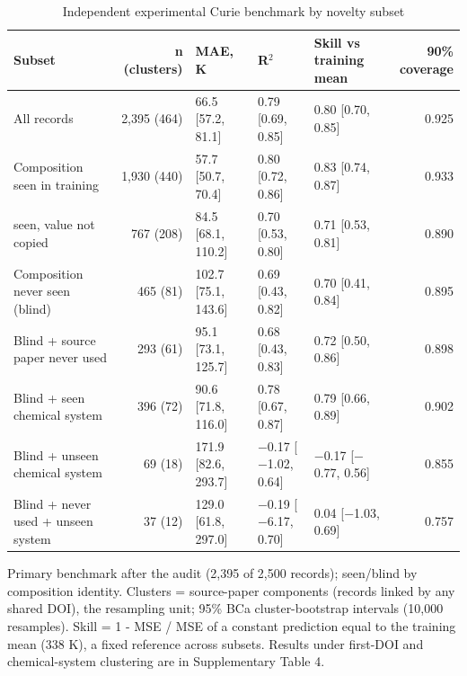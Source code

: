 \begin{table}
\caption{Independent experimental Curie benchmark by novelty subset}
\label{tab:table6_external_benchmark}
\tablefont
\begin{tabularx}{\textwidth}{@{}>{\raggedright\arraybackslash}Xrlllr@{}}
\toprule
\textbf{Subset} & \textbf{n (clusters)} & \textbf{MAE, K} & \textbf{R$^2$} & \textbf{Skill vs training mean} & \textbf{90\% coverage} \\
\midrule
All records & 2,395 (464) & 66.5 [57.2, 81.1] & 0.79 [0.69, 0.85] & 0.80 [0.70, 0.85] & 0.925 \\
Composition seen in training & 1,930 (440) & 57.7 [50.7, 70.4] & 0.80 [0.72, 0.86] & 0.83 [0.74, 0.87] & 0.933 \\
\quad seen, value not copied & 767 (208) & 84.5 [68.1, 110.2] & 0.70 [0.53, 0.80] & 0.71 [0.53, 0.81] & 0.890 \\
Composition never seen (blind) & 465 (81) & 102.7 [75.1, 143.6] & 0.69 [0.43, 0.82] & 0.70 [0.41, 0.84] & 0.895 \\
Blind + source paper never used & 293 (61) & 95.1 [73.1, 125.7] & 0.68 [0.43, 0.83] & 0.72 [0.50, 0.86] & 0.898 \\
Blind + seen chemical system & 396 (72) & 90.6 [71.8, 116.0] & 0.78 [0.67, 0.87] & 0.79 [0.66, 0.89] & 0.902 \\
Blind + unseen chemical system & 69 (18) & 171.9 [82.6, 293.7] & $-$0.17 [$-$1.02, 0.64] & $-$0.17 [$-$0.77, 0.56] & 0.855 \\
Blind + never used + unseen system & 37 (12) & 129.0 [61.8, 297.0] & $-$0.19 [$-$6.17, 0.70] & 0.04 [$-$1.03, 0.69] & 0.757 \\
\bottomrule
\end{tabularx}
\par\vspace{4pt}\raggedright\noindent Primary benchmark after the audit (2,395 of 2,500 records); seen/blind by composition identity. Clusters = source-paper components (records linked by any shared DOI), the resampling unit; 95\% BCa cluster-bootstrap intervals (10,000 resamples). Skill = 1 - MSE / MSE of a constant prediction equal to the training mean (338 K), a fixed reference across subsets. Results under first-DOI and chemical-system clustering are in Supplementary Table 4.
\end{table}
